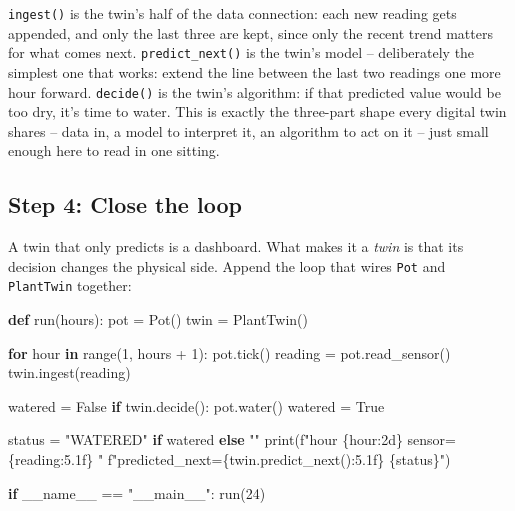 \documentclass[
  12pt,
  a4paper,
]{article}
\newenvironment{Shaded}{}{}
\newcommand{\BuiltInTok}[1]{\textcolor[rgb]{0.00,0.50,0.00}{#1}}
\newcommand{\ControlFlowTok}[1]{\textcolor[rgb]{0.00,0.44,0.13}{\textbf{#1}}}
\newcommand{\DecValTok}[1]{\textcolor[rgb]{0.25,0.63,0.44}{#1}}
\newcommand{\KeywordTok}[1]{\textcolor[rgb]{0.00,0.44,0.13}{\textbf{#1}}}
\newcommand{\NormalTok}[1]{#1}
\newcommand{\OperatorTok}[1]{\textcolor[rgb]{0.40,0.40,0.40}{#1}}
\newcommand{\SpecialCharTok}[1]{\textcolor[rgb]{0.25,0.44,0.63}{#1}}
\newcommand{\SpecialStringTok}[1]{\textcolor[rgb]{0.73,0.40,0.53}{#1}}
\newcommand{\StringTok}[1]{\textcolor[rgb]{0.25,0.44,0.63}{#1}}
\newcommand{\VariableTok}[1]{\textcolor[rgb]{0.10,0.09,0.49}{#1}}
\begin{document}
\texttt{ingest()} is the twin's half of the data connection: each new
reading gets appended, and only the last three are kept, since only the
recent trend matters for what comes next. \texttt{predict\_next()} is
the twin's model -- deliberately the simplest one that works: extend the
line between the last two readings one more hour forward.
\texttt{decide()} is the twin's algorithm: if that predicted value would
be too dry, it's time to water. This is exactly the three-part shape
every digital twin shares -- data in, a model to interpret it, an
algorithm to act on it -- just small enough here to read in one sitting.

\subsection{Step 4: Close the loop}\label{step-4-close-the-loop}

A twin that only predicts is a dashboard. What makes it a \emph{twin} is
that its decision changes the physical side. Append the loop that wires
\texttt{Pot} and \texttt{PlantTwin} together:

\begin{Shaded}
\begin{Highlighting}[]


\KeywordTok{def}\NormalTok{ run(hours):}
\NormalTok{    pot }\OperatorTok{=}\NormalTok{ Pot()}
\NormalTok{    twin }\OperatorTok{=}\NormalTok{ PlantTwin()}

    \ControlFlowTok{for}\NormalTok{ hour }\KeywordTok{in} \BuiltInTok{range}\NormalTok{(}\DecValTok{1}\NormalTok{, hours }\OperatorTok{+} \DecValTok{1}\NormalTok{):}
\NormalTok{        pot.tick()}
\NormalTok{        reading }\OperatorTok{=}\NormalTok{ pot.read\_sensor()}
\NormalTok{        twin.ingest(reading)}

\NormalTok{        watered }\OperatorTok{=} \VariableTok{False}
        \ControlFlowTok{if}\NormalTok{ twin.decide():}
\NormalTok{            pot.water()}
\NormalTok{            watered }\OperatorTok{=} \VariableTok{True}

\NormalTok{        status }\OperatorTok{=} \StringTok{"WATERED"} \ControlFlowTok{if}\NormalTok{ watered }\ControlFlowTok{else} \StringTok{""}
        \BuiltInTok{print}\NormalTok{(}\SpecialStringTok{f"hour }\SpecialCharTok{\{}\NormalTok{hour}\SpecialCharTok{:2d\}}\SpecialStringTok{  sensor=}\SpecialCharTok{\{}\NormalTok{reading}\SpecialCharTok{:5.1f\}}\SpecialStringTok{  "}
              \SpecialStringTok{f"predicted\_next=}\SpecialCharTok{\{}\NormalTok{twin}\SpecialCharTok{.}\NormalTok{predict\_next()}\SpecialCharTok{:5.1f\}}\SpecialStringTok{  }\SpecialCharTok{\{}\NormalTok{status}\SpecialCharTok{\}}\SpecialStringTok{"}\NormalTok{)}


\ControlFlowTok{if} \VariableTok{\_\_name\_\_} \OperatorTok{==} \StringTok{"\_\_main\_\_"}\NormalTok{:}
\NormalTok{    run(}\DecValTok{24}\NormalTok{)}
\end{Highlighting}
\end{Shaded}
\end{document}
